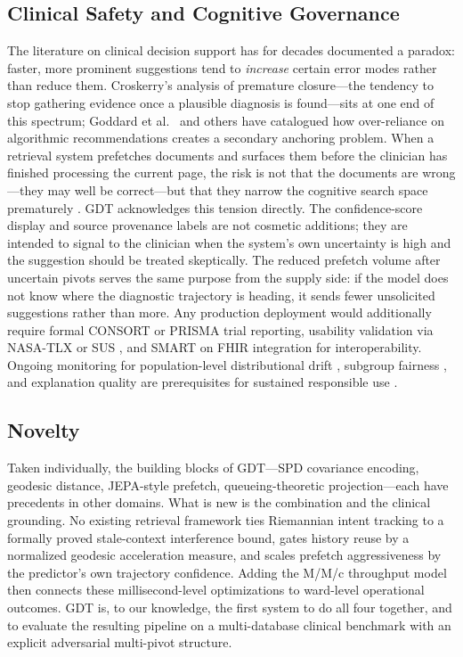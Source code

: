 \documentclass[review]{elsarticle}
\begin{document}
\subsection{Clinical Safety and Cognitive Governance}
The literature on clinical decision support has for decades documented a paradox:
faster, more prominent suggestions tend to \emph{increase} certain error modes
rather than reduce them. Croskerry's \cite{croskerry2003} analysis of premature
closure---the tendency to stop gathering evidence once a plausible diagnosis is
found---sits at one end of this spectrum; Goddard et al.\ \cite{goddard2012} and
others \cite{musen2014_cds,sutton2020_cds} have catalogued how over-reliance on
algorithmic recommendations creates a secondary anchoring problem. When a
retrieval system prefetches documents and surfaces them before the clinician has
finished processing the current page, the risk is not that the documents are
wrong---they may well be correct---but that they narrow the cognitive search space
prematurely \cite{sweller1988_cogl}. GDT acknowledges this tension directly. The
confidence-score display and source provenance labels are not cosmetic additions;
they are intended to signal to the clinician when the system's own uncertainty is
high and the suggestion should be treated skeptically. The reduced prefetch volume
after uncertain pivots serves the same purpose from the supply side: if the model
does not know where the diagnostic trajectory is heading, it sends fewer unsolicited
suggestions rather than more. Any production deployment would additionally require
formal CONSORT \cite{schulz2010_consort} or PRISMA \cite{moher09} trial reporting,
usability validation via NASA-TLX \cite{hart1988} or SUS \cite{brooke1996}, and
SMART on FHIR \cite{mandel2016} integration for interoperability. Ongoing
monitoring for population-level distributional drift \cite{lee2020_continual},
subgroup fairness \cite{chen24}, and explanation quality \cite{amann20} are
prerequisites for sustained responsible use \cite{lekadir25,zhu2026_aicare}.

\subsection{Novelty}
Taken individually, the building blocks of GDT---SPD covariance encoding,
geodesic distance, JEPA-style prefetch, queueing-theoretic projection---each have
precedents in other domains. What is new is the combination and the clinical
grounding. No existing retrieval framework ties Riemannian intent tracking to a
formally proved stale-context interference bound, gates history reuse by a
normalized geodesic acceleration measure, and scales prefetch aggressiveness by
the predictor's own trajectory confidence. Adding the M/M/c throughput model then
connects these millisecond-level optimizations to ward-level operational outcomes.
GDT is, to our knowledge, the first system to do all four together, and to
evaluate the resulting pipeline on a multi-database clinical benchmark with an
explicit adversarial multi-pivot structure.
\end{document}
